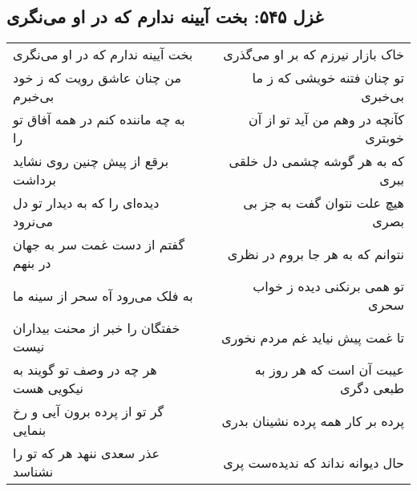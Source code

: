 \begin{center}
\section*{غزل ۵۴۵: بخت آیینه ندارم که در او می‌نگری}
\label{sec:545}
\begin{longtable}{l p{0.5cm} r}
بخت آیینه ندارم که در او می‌نگری
&&
خاک بازار نیرزم که بر او می‌گذری
\\
من چنان عاشق رویت که ز خود بی‌خبرم
&&
تو چنان فتنه خویشی که ز ما بی‌خبری
\\
به چه ماننده کنم در همه آفاق تو را
&&
کآنچه در وهم من آید تو از آن خوبتری
\\
برقع از پیش چنین روی نشاید برداشت
&&
که به هر گوشه چشمی دل خلقی ببری
\\
دیده‌ای را که به دیدار تو دل می‌نرود
&&
هیچ علت نتوان گفت به جز بی بصری
\\
گفتم از دست غمت سر به جهان در بنهم
&&
نتوانم که به هر جا بروم در نظری
\\
به فلک می‌رود آه سحر از سینه ما
&&
تو همی برنکنی دیده ز خواب سحری
\\
خفتگان را خبر از محنت بیداران نیست
&&
تا غمت پیش نیاید غم مردم نخوری
\\
هر چه در وصف تو گویند به نیکویی هست
&&
عیبت آن است که هر روز به طبعی دگری
\\
گر تو از پرده برون آیی و رخ بنمایی
&&
پرده بر کار همه پرده نشینان بدری
\\
عذر سعدی ننهد هر که تو را نشناسد
&&
حال دیوانه نداند که ندیده‌ست پری
\\
\end{longtable}
\end{center}
